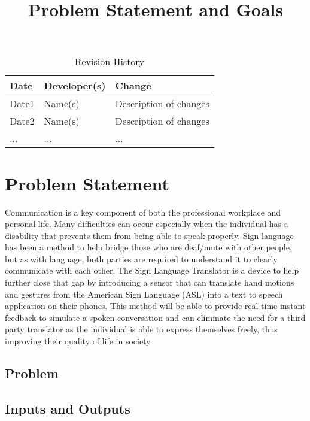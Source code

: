 \documentclass{article}
\title{Problem Statement and Goals\\\progname}
\author{\authname}
\date{}
\begin{document}
\maketitle

\begin{table}[hp]
\caption{Revision History} \label{TblRevisionHistory}
\begin{tabularx}{\textwidth}{llX}
\toprule
\textbf{Date} & \textbf{Developer(s)} & \textbf{Change}\\
\midrule
Date1 & Name(s) & Description of changes\\
Date2 & Name(s) & Description of changes\\
... & ... & ...\\
\bottomrule
\end{tabularx}
\end{table}

\section{Problem Statement}

Communication is a key component of both the professional workplace and personal life. Many difficulties
can occur especially when the individual has a disability that prevents them from being able to speak properly.
Sign language has been a method to help bridge those who are deaf/mute with other people, but as with language,
both parties are required to understand it to clearly communicate with each other. The Sign Language Translator
is a device to help further close that gap by introducing a sensor that can translate hand motions and gestures
from the American Sign Language (ASL) into a text to speech application on their phones. This method will be able
to provide real-time instant feedback to simulate a spoken conversation and can eliminate the need for a third party
translator as the individual is able to express themselves freely, thus improving their quality of life in society. 

\subsection{Problem}

\subsection{Inputs and Outputs}

\end{document}
